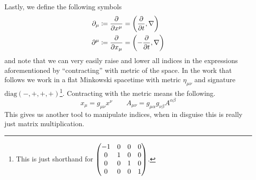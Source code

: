 Lastly, we define the following symbols
\begin{align}\label{eq:partials}
    \begin{split}
        \partial_\mu & \coloneqq\pdv{x^\mu} = \left(\pdv{t}, \nabla\right) \\
        \partial^\mu & \coloneqq\pdv{x_\mu} = \left(-\pdv{t},\nabla\right)
    \end{split}
\end{align}
and note that we can very easily raise and lower all indices in the expressions
aforementioned by ``contracting'' with metric of the space. In the work that
follows we work in a flat Minkowski spacetime with metric \(\eta_{\mu\nu}\) and
signature \(\mathrm{diag}(-,+,+,+)\)\footnote{This is just shorthand for
\(\mqty(\dmat[0]{-1,1,1,1})\).}. Contracting with the metric means the
following.
\begin{equation}
    x_\mu = g_{\mu\nu}x^\nu \qquad A_{\mu\nu} = g_{\mu\alpha}g_{\nu\beta}A^{\alpha\beta}
\end{equation}
This gives us another tool to manipulate indices, when in disguise this is
really just matrix multiplication.
